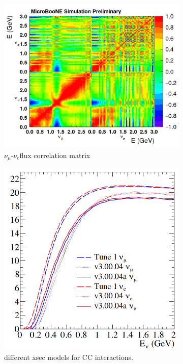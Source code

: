 \documentclass[a4paper]{article}
\begin{document}
\begin{figure}[ht] 
\begin{center}
    \begin{subfigure}[b]{0.42\textwidth}
    \centering
    \includegraphics[width=1.00\textwidth]{introduction/fluxcorrelation.png}
    \caption{\label{fig:numuconstraint:flux}$\nu_{\mu}$-$\nu_e$flux correlation matrix}
    \end{subfigure}
    \begin{subfigure}[b]{0.3\textwidth}
    \centering
    \includegraphics[width=1.00\textwidth]{introduction/xsec_mcc8_mcc9.png}
    \caption{\label{fig:numuconstraint:xsec}different xsec models for CC interactions.}
    \end{subfigure}
\caption{\label{fig:numuconstraint}}
\end{center}
\end{figure}
\end{document}
